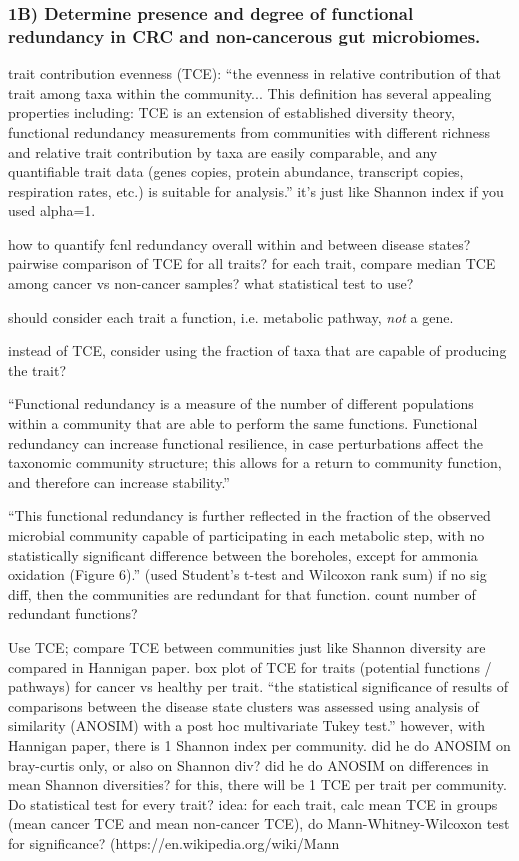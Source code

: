 \documentclass[11pt]{article}
\begin{document}
\subsubsection*{1B) Determine presence and degree of functional redundancy in CRC and non-cancerous gut microbiomes.}

trait contribution evenness (TCE): ``the evenness in relative contribution of that trait among taxa within the community... This definition has several appealing properties including: TCE is an extension of established diversity theory, functional redundancy measurements from communities with different richness and relative trait contribution by taxa are easily comparable, and any quantifiable trait data (genes copies, protein abundance, transcript copies, respiration rates, etc.) is suitable for analysis.'' \cite{royalty_quantitative_2020}
it's just like Shannon index if you used alpha=1.

how to quantify fcnl redundancy overall within and between disease states?
pairwise comparison of TCE for all traits?
for each trait, compare median TCE among cancer vs non-cancer samples?
what statistical test to use?

should consider each trait a function, i.e. metabolic pathway, \textit{not} a gene.

instead of TCE, consider using the fraction of taxa that are capable of producing the trait?

``Functional redundancy is a measure of the number of different populations within a community that are able to perform the same functions. Functional redundancy can increase functional resilience, in case perturbations affect the taxonomic community structure; this allows for a return to community function, and therefore can increase stability.'' \cite{heintz-buschart_human_2018}

``This functional redundancy is further reflected in the fraction of the observed microbial community capable of participating in each metabolic step, with no statistically significant difference between the boreholes, except for ammonia oxidation (Figure 6).'' (used Student's t-test and Wilcoxon rank sum) \cite{tully_dynamic_2018}
if no sig diff, then the communities are redundant for that function. count number of redundant functions?

Use TCE; compare TCE between communities just like Shannon diversity are compared in Hannigan paper. box plot of TCE for traits (potential functions / pathways) for cancer vs healthy per trait. ``the statistical significance of results of comparisons between the disease state clusters was assessed using analysis of similarity (ANOSIM) with a post hoc multivariate Tukey test.'' \cite{hannigan_diagnostic_2018}
however, with Hannigan paper, there is 1 Shannon index per community. did he do ANOSIM on bray-curtis only, or also on Shannon div? did he do ANOSIM on differences in mean Shannon diversities?
for this, there will be 1 TCE per trait per community. Do statistical test for every trait?
idea: for each trait, calc mean TCE in groups (mean cancer TCE and mean non-cancer TCE), do Mann-Whitney-Wilcoxon test for significance? (https://en.wikipedia.org/wiki/Mann%
\end{document}

